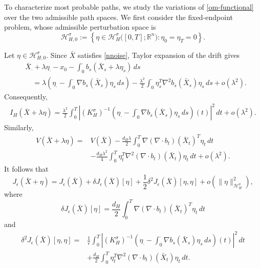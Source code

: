 \documentclass[preprint,12pt]{elsarticle}
\theoremstyle{definition}
\theoremstyle{plain}
\begin{document}
To characterize most probable paths, we study the variations of
\eqref{om-functional} over the two admissible path spaces. We first
consider the fixed-endpoint problem, whose admissible perturbation
space is
\begin{equation*}
    \mathcal H_{H,0}^\sigma
    :=
    \left\{
        \eta\in
        \mathcal H_H^\sigma\bigl([0,T];\mathbb R^n\bigr):
        \eta_0=\eta_T=0
    \right\}.
\end{equation*}

Let $\eta\in\mathcal H_{H,0}^\sigma$. Since $\bar X$ satisfies
\eqref{nnoise}, Taylor expansion of the drift gives
\begin{align*}
&\bar X_\cdot+\lambda\eta_\cdot-x_0
-\int_0^\cdot b_s(\bar X_s+\lambda\eta_s)\,ds
\\
&\quad=
\lambda
\left(
    \eta_\cdot
    -
    \int_0^\cdot
    \nabla b_s(\bar X_s)\eta_s\,ds
\right)
-
\frac{\lambda^2}{2}
\int_0^\cdot
\eta_s^T\nabla^2b_s(\bar X_s)\eta_s\,ds
+
o(\lambda^2).
\end{align*}
Consequently,
\begin{equation*}
\begin{aligned}
I_H(\bar X+\lambda\eta)
=
\frac{\lambda^2}{2}
\int_0^T
\left|
(K_H^\sigma)^{-1}
\left(
    \eta_\cdot
    -
    \int_0^\cdot
    \nabla b_s(\bar X_s)\eta_s\,ds
\right)(t)
\right|^2\,dt
+
o(\lambda^2).
\end{aligned}
\end{equation*}
Similarly,
\begin{equation*}
\begin{aligned}
V(\bar X+\lambda\eta)
={}&
V(\bar X)
-
\frac{d_H\lambda}{2}
\int_0^T
\nabla(\nabla\!\cdot b_t)(\bar X_t)^T\eta_t\,dt
\\
&-
\frac{d_H\lambda^2}{4}
\int_0^T
\eta_t^T
\nabla^2(\nabla\!\cdot b_t)(\bar X_t)
\eta_t\,dt
+
o(\lambda^2).
\end{aligned}
\end{equation*}
It follows that
\begin{equation}
\label{eq:J-taylor-variation}
    J_\epsilon(\bar X+\eta)
    =
    J_\epsilon(\bar X)
    +
    \delta J_\epsilon(\bar X)[\eta]
    +
    \frac12
    \delta^2J_\epsilon(\bar X)[\eta,\eta]
    +
    o\left(
        \|\eta\|_{\mathcal H_H^\sigma}^2
    \right),
\end{equation}
where
\begin{equation}
\label{eq:first-variation-barX}
    \delta J_\epsilon(\bar X)[\eta]
    =
    \frac{d_H}{2}
    \int_0^T
    \nabla(\nabla\!\cdot b_t)(\bar X_t)^T\eta_t\,dt
\end{equation}
and
\begin{equation}
\label{eq:second-variation-barX}
\begin{aligned}
\delta^2J_\epsilon(\bar X)[\eta,\eta]
={}&
\frac{1}{\epsilon}
\int_0^T
\left|
(K_H^\sigma)^{-1}
\left(
    \eta_\cdot
    -
    \int_0^\cdot
    \nabla b_s(\bar X_s)\eta_s\,ds
\right)(t)
\right|^2\,dt
\\
&+
\frac{d_H}{2}
\int_0^T
\eta_t^T
\nabla^2(\nabla\!\cdot b_t)(\bar X_t)
\eta_t\,dt.
\end{aligned}
\end{equation}
\end{document}
